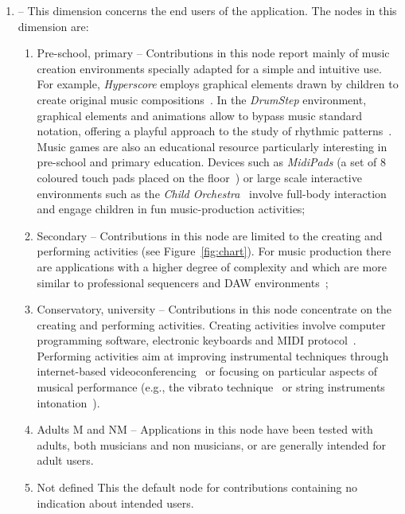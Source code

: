 \documentclass[10pt,journal,compsoc]{IEEEtran}
\newcommand{\dimension}[1]{{\fontfamily{cmss}\selectfont {\textit{#1}}}}
\newcommand{\node}[1]{{\fontfamily{cmss}\selectfont #1}}
\begin{document}
\begin{enumerate}[label=3.\arabic*.,leftmargin=0.7cm,listparindent=-\leftmargin, start=0]
\item \dimension{Users} -- This dimension concerns the end users of the application. The nodes in this dimension are:
%
\begin{enumerate}[label=3.1.\arabic*.,leftmargin=0.9cm,listparindent=-\leftmargin, start=0]
%   
\item \node{Pre-school, primary} -- Contributions in this node report mainly of music creation environments specially adapted for a simple and intuitive use. For example, \textit{Hyperscore} employs graphical elements drawn by children to create original music compositions~\cite{farbood2004hyperscore}. In the \textit{DrumStep} environment, graphical elements and animations allow to bypass music standard notation, offering a playful approach to the study of rhythmic patterns~\cite{McCarthy}. Music games are also an educational resource particularly interesting in pre-school and primary education. Devices such as \textit{MidiPads} (a set of 8 coloured touch pads placed on the floor~\cite{mcdowall2003music}) or large scale interactive environments such as the \textit{Child Orchestra}~\cite{core} involve full-body interaction and engage children in fun music-production activities;
%              
\item \node{Secondary} -- Contributions in this node are limited to the creating and performing activities (see Figure~\ref{fig:chart}). For music production there are applications with a higher degree of complexity and which are more similar to professional sequencers and DAW environments~\cite{dillon2003,mellor};
%
\item \node{Conservatory, university} -- Contributions in this node concentrate on the creating and performing activities. Creating activities involve computer programming software, electronic keyboards and MIDI protocol~\cite{airy}. Performing activities aim at improving instrumental techniques through internet-based videoconferencing~\cite{dammers} or focusing on particular aspects of musical performance (e.g., the vibrato technique~\cite{ho} or string instruments intonation~\cite{hopkins2014pilot}).
%
\item \node{Adults M and NM} -- Applications in this node  have been tested with adults, both musicians and non musicians, or are generally intended for adult users.
%
\item \node{Not defined} This the default node for contributions containing no indication about intended users. 
\end{enumerate}


\end{enumerate}
\end{document}

